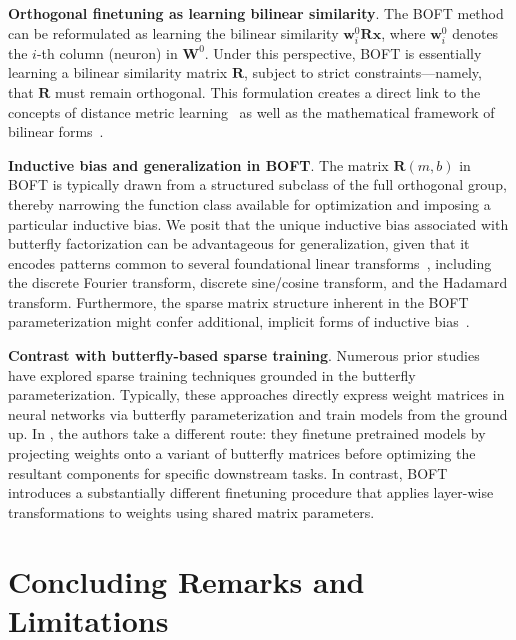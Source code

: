 \textbf{Orthogonal finetuning as learning bilinear similarity}. The BOFT method can be reformulated as learning the bilinear similarity $\bm{w}^0_i\bm{R}\bm{x}$, where $\bm{w}^0_i$ denotes the $i$-th column (neuron) in $\bm{W}^0$. Under this perspective, BOFT is essentially learning a bilinear similarity matrix $\bm{R}$, subject to strict constraints—namely, that $\bm{R}$ must remain orthogonal. This formulation creates a direct link to the concepts of distance metric learning~\cite{xing2002distance} as well as the mathematical framework of bilinear forms~\cite{roman2005advanced}.

\textbf{Inductive bias and generalization in BOFT}. The matrix $\bm{R}(m,b)$ in BOFT is typically drawn from a structured subclass of the full orthogonal group, thereby narrowing the function class available for optimization and imposing a particular inductive bias. We posit that the unique inductive bias associated with butterfly factorization can be advantageous for generalization, given that it encodes patterns common to several foundational linear transforms~\cite{dao2019kaleidoscope}, including the discrete Fourier transform, discrete sine/cosine transform, and the Hadamard transform. Furthermore, the sparse matrix structure inherent in the BOFT parameterization might confer additional, implicit forms of inductive bias~\cite{gunasekar2017implicit,li2018algorithmic,liu2019neural}.

\textbf{Contrast with butterfly-based sparse training}. Numerous prior studies~\cite{dao2019learning,dao2019kaleidoscope,chen2022pixelated,dao2022monarch} have explored sparse training techniques grounded in the butterfly parameterization. Typically, these approaches directly express weight matrices in neural networks via butterfly parameterization and train models from the ground up. In \cite{dao2022monarch}, the authors take a different route: they finetune pretrained models by projecting weights onto a variant of butterfly matrices before optimizing the resultant components for specific downstream tasks. In contrast, BOFT introduces a substantially different finetuning procedure that applies layer-wise transformations to weights using shared matrix parameters.



\section{Concluding Remarks and Limitations}

